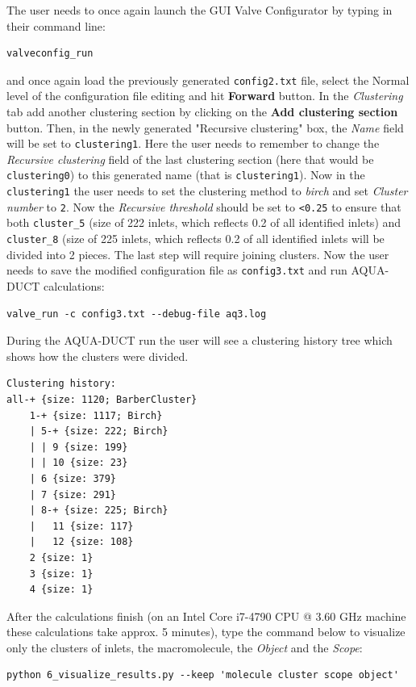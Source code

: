\documentclass[9pt,tutorial]{livecoms}
\begin{document}
The user needs to once again launch the GUI Valve Configurator by typing in their command line:
\begin{lstlisting}
valveconfig_run
\end{lstlisting}
and once again load the previously generated \texttt{config2.txt} file, select the Normal level of the configuration file editing and hit \textbf{Forward} button. In the \textit{Clustering} tab add another clustering section by clicking on the \textbf{Add clustering section} button. Then, in the newly generated "Recursive clustering" box, the \textit{Name} field will be set to \texttt{clustering1}. Here the user needs to remember to change the \textit{Recursive clustering} field of the last clustering section (here that would be \texttt{clustering0}) to this generated name (that is \texttt{clustering1}). Now in the \texttt{clustering1} the user needs to set the clustering method to \emph{birch} and set \emph{Cluster number} to \texttt{2}. Now the \emph{Recursive threshold} should be set to \texttt{<0.25} to ensure that both \texttt{cluster\_5} (size of 222 inlets, which reflects 0.2 of all identified inlets) and \texttt{cluster\_8} (size of 225 inlets, which reflects 0.2 of all identified inlets will be divided into 2 pieces. The last step will require joining clusters.
Now the user needs to save the modified configuration file as \texttt{config3.txt} and run AQUA-DUCT calculations:
\begin{lstlisting}[columns=fullflexible]
valve_run -c config3.txt --debug-file aq3.log
\end{lstlisting}
During the AQUA-DUCT run the user will see a clustering history tree which shows how the clusters were divided.
\begin{lstlisting}
Clustering history:
all-+ {size: 1120; BarberCluster}
    1-+ {size: 1117; Birch}
    | 5-+ {size: 222; Birch}
    | | 9 {size: 199}
    | | 10 {size: 23}
    | 6 {size: 379}
    | 7 {size: 291}
    | 8-+ {size: 225; Birch}
    |   11 {size: 117}
    |   12 {size: 108}
    2 {size: 1}
    3 {size: 1}
    4 {size: 1}
\end{lstlisting}

After the calculations finish (on an Intel Core i7-4790 CPU @ 3.60 GHz machine these calculations take approx. 5 minutes), type the command below to visualize only the clusters of inlets, the macromolecule, the \emph{Object} and the \emph{Scope}:
\begin{lstlisting}[columns=fullflexible]
python 6_visualize_results.py --keep 'molecule cluster scope object'
\end{lstlisting}
\end{document}
